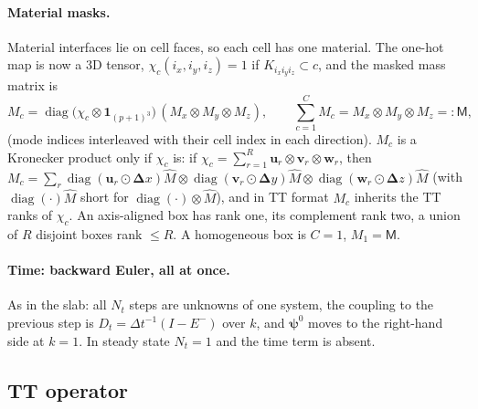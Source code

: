 \documentclass[11pt,a4paper]{article}
\newcommand{\kron}{\otimes}
\newcommand{\diag}{\operatorname{diag}}
\begin{document}
\paragraph{Material masks.} Material interfaces lie on cell faces, so each cell has one material. The one-hot map is now a 3D tensor, $\chi_c(i_x,i_y,i_z)=1$ if $K_{i_xi_yi_z}\subset c$, and the masked mass matrix is
\begin{equation}
M_c=\diag\big(\chi_c\kron\bm 1_{(p+1)^3}\big)\,(M_x\kron M_y\kron M_z),\qquad \sum_{c=1}^CM_c=M_x\kron M_y\kron M_z=:\mathsf M,
\label{eq:Mc}
\end{equation}
(mode indices interleaved with their cell index in each direction). $M_c$ is a Kronecker product only if $\chi_c$ is: if $\chi_c=\sum_{r=1}^{R}\bm u_r\kron\bm v_r\kron\bm w_r$, then $M_c=\sum_r\diag(\bm u_r\odot\bm\Delta x)\hat M\kron\diag(\bm v_r\odot\bm\Delta y)\hat M\kron\diag(\bm w_r\odot\bm\Delta z)\hat M$ (with $\diag(\cdot)\hat M$ short for $\diag(\cdot)\kron\hat M$), and in TT format $M_c$ inherits the TT ranks of $\chi_c$. An axis-aligned box has rank one, its complement rank two, a union of $R$ disjoint boxes rank $\le R$. A homogeneous box is $C=1$, $M_1=\mathsf M$.

\paragraph{Time: backward Euler, all at once.} As in the slab: all $N_t$ steps are unknowns of one system, the coupling to the previous step is $D_t=\Delta t^{-1}(I-E^-)$ over $k$, and $\bm\psi^0$ moves to the right-hand side at $k=1$. In steady state $N_t=1$ and the time term is absent.

\subsection{TT operator}
\label{sec:operator}
\end{document}
